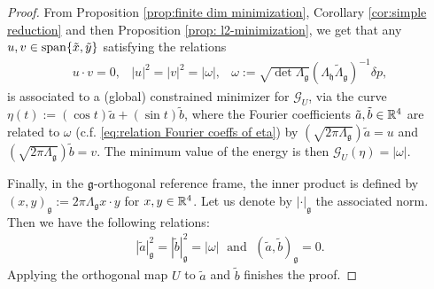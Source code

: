 \begin{proof}
From Proposition \ref{prop:finite dim minimization}, Corollary \ref{cor:simple reduction} and then Proposition \ref{prop: l2-minimization}, we get that any $u, v \in \operatorname{span}\{\tilde{x}, \tilde{y}\}$ satisfying the relations
\begin{eqnarray}
 u \cdot v = 0, & |u|^2 = |v|^2 =  |\omega|, & \omega := \sqrt{\det \Lambda_{\mathfrak{g}}} (\Lambda_{\mathfrak{h}} \tilde{\Lambda}_{\mathfrak{g}})^{-1} \delta p,
\end{eqnarray}
is associated to a (global) constrained minimizer for $\mathcal{G}_{U}$, via the curve $\eta(t) := (\cos t) \tilde{a} + (\sin t) \tilde{b}$, where the Fourier coefficients $\tilde{a}, \tilde{b} \in \mathbb{R}^4$ are related to $\omega$ (c.f. \ref{eq:relation Fourier coeffs of eta}) by $(\sqrt{2 \pi \Lambda_{\mathfrak{g}}}) \tilde{a} = u$ and $(\sqrt{2 \pi \Lambda_{\mathfrak{g}}}) \tilde{b} = v$. The minimum value of the energy is then $\mathcal{G}_{U}(\eta) = |\omega|$.

Finally, in the $\mathfrak{g}$-orthogonal reference frame, the inner product is defined by $(x, y)_{\mathfrak{g}} := 2 \pi \Lambda_{\mathfrak{g}}x \cdot y$ for $x,y \in \mathbb{R}^4$. Let us denote by $|\cdot|_{\mathfrak{g}}$ the associated norm. Then we have the following relations:
\begin{align}
|\tilde{a}|_{\mathfrak{g}}^2 = |\tilde{b}|_{\mathfrak{g}}^{2} = |\omega| \;  \text{ and } \; (\tilde{a}, \tilde{b})_{\mathfrak{g}} = 0.
\end{align}
Applying the orthogonal map $U$ to $\tilde{a}$ and $\tilde{b}$ finishes the proof.
\end{proof}

